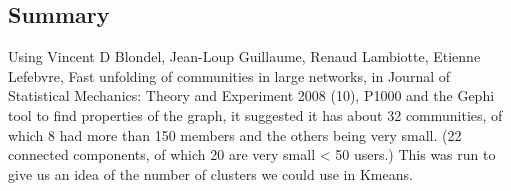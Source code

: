 \subsection{Summary}

Using Vincent D Blondel, Jean-Loup Guillaume, Renaud Lambiotte, Etienne Lefebvre, Fast unfolding of communities in large networks, in Journal of Statistical Mechanics: Theory and Experiment 2008 (10), P1000 and the Gephi tool to find properties of the graph, it suggested it has about
32 communities, of which 8 had more than 150 members and the others being very small. (22 connected components, of which 20 are very small < 50 users.) This was run to give us an idea of the number of clusters we could use in Kmeans.


